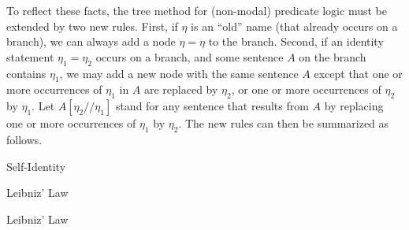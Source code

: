 To reflect these facts, the tree method for (non-modal) predicate logic must be
extended by two new rules. First, if $\eta$ is an ``old'' name (that already
occurs on a branch), we can always add a node $\eta=\eta$ to the branch.
Second, if an identity statement $\eta_1=\eta_2$ occurs on a branch, and some
sentence $A$ on the branch contains $\eta_1$, we may add a new node with
the same sentence $A$ except that one or more occurrences of $\eta_1$ in $A$ are
replaced by $\eta_2$, or one or more occurrences of $\eta_2$ by $\eta_1$. Let
$A[\eta_2/\!/\eta_1]$ stand for any sentence that results from $A$ by replacing
one or more occurrences of $\eta_1$ by $\eta_2$. The new rules can then be
summarized as follows.

\bigskip
\begin{center}
  \begin{minipage}[t]{0.3\textwidth} \centering

    Self-Identity
    
  \end{minipage}
  \begin{minipage}[t]{0.3\textwidth} \centering
    Leibniz' Law
    \bigskip

  \end{minipage}
  \begin{minipage}[t]{0.3\textwidth} \centering
    Leibniz' Law
    \bigskip

  \end{minipage}
  
\end{center}

